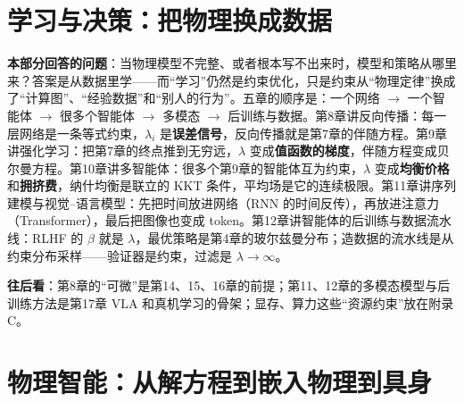 \documentclass[11pt,a4paper,twoside,openright]{book}
\theoremstyle{definition}
\newenvironment{partintro}
{\begin{tcolorbox}[colback=gray!5, colframe=gray!50, boxrule=0.6pt, arc=2mm, left=8pt, right=8pt, top=6pt, bottom=6pt, title=本部分导读, fonttitle=\bfseries]}
{\end{tcolorbox}}
\begin{document}


\part{学习与决策：把物理换成数据}

\begin{partintro}
\textbf{本部分回答的问题}：当物理模型不完整、或者根本写不出来时，模型和策略从哪里来？答案是从数据里学——而“学习”仍然是约束优化，只是约束从“物理定律”换成了“计算图”、“经验数据”和“别人的行为”。五章的顺序是：一个网络 $\to$ 一个智能体 $\to$ 很多个智能体 $\to$ 多模态 $\to$ 后训练与数据。第8章讲反向传播：每一层网络是一条等式约束，$\lambda_i$ 是\textbf{误差信号}，反向传播就是第7章的伴随方程。第9章讲强化学习：把第7章的终点推到无穷远，$\lambda$ 变成\textbf{值函数的梯度}，伴随方程变成贝尔曼方程。第10章讲多智能体：很多个第9章的智能体互为约束，$\lambda$ 变成\textbf{均衡价格}和\textbf{拥挤费}，纳什均衡是联立的 KKT 条件，平均场是它的连续极限。第11章讲序列建模与视觉--语言模型：先把时间放进网络（RNN 的时间反传），再放进注意力（Transformer），最后把图像也变成 token。第12章讲智能体的后训练与数据流水线：RLHF 的 $\beta$ 就是 $\lambda$，最优策略是第4章的玻尔兹曼分布；造数据的流水线是从约束分布采样——验证器是约束，过滤是 $\lambda\to\infty$。

\textbf{往后看}：第8章的“可微”是第14、15、16章的前提；第11、12章的多模态模型与后训练方法是第17章 VLA 和真机学习的骨架；显存、算力这些“资源约束”放在附录C。
\end{partintro}



\part{物理智能：从解方程到嵌入物理到具身}
\end{document}
